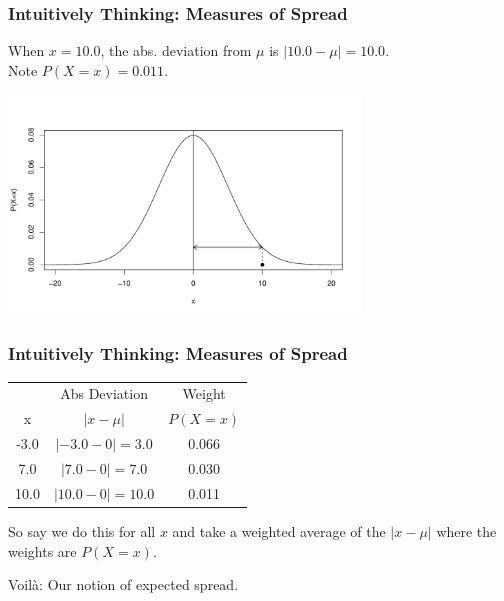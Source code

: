 \documentclass[handout]{beamer}
\newcommand{\blue}[1]{\textcolor{blue2}{#1}}
\begin{document}
\begin{frame}
\frametitle{Intuitively Thinking:  Measures of Spread}
When $x=10.0$, the abs. deviation from $\mu$ is $|10.0 - \mu| = 10.0$.\\
Note $P(X=x) = 0.011$.

\begin{center}
\includegraphics[width=0.7\textwidth]{figure/spread4}
\end{center}

\end{frame}


\begin{frame}
\frametitle{Intuitively Thinking:  Measures of Spread}

%
%
\begin{center}
\begin{tabular}{c|cc}
 & Abs Deviation & Weight \\
x& $|x-\mu|$  & $P(X=x)$\\
\hline
-3.0 & $|-3.0 - 0|=3.0$  & 0.066\\
7.0 & $|7.0-0|=7.0$ & 0.030\\
10.0 & $|10.0-0| = 10.0$ & 0.011\\
\end{tabular}
\end{center}

So say we do this for \blue{all} $x$ and take a \blue{weighted average} of the $|x-\mu|$ where the weights are $P(X=x)$.

\vspace{0.5cm}

Voil\`{a}:  Our notion of \blue{expected spread}.  

\end{frame}
\end{document}
